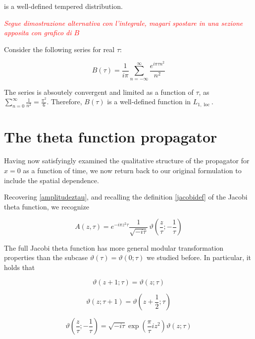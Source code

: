 \documentclass{article}
\newcommand{\T}{\ensuremath{\vartheta}}
\newcommand{\cmnt}[1]{\textcolor{red}{\emph{#1}}}
\newcommand{\sumZ}{\sum_{n=-\infty}^{\infty}}
\newcommand{\locint}{L_{1,\operatorname{loc}}}
\begin{document}
is a well-defined tempered distribution.



\cmnt{Segue dimostrazione alternativa con l'integrale, magari spostare in una sezione apposita con grafico di $B$}

Consider the following series for real $\tau$:

\begin{equation}
    B(\tau) = \frac{1}{i\pi}\sumZ \frac{e^{i\pi\tau n^2} }{n^2}
\end{equation}

The series is absoutely convergent and limited as a function of $\tau$, as $\sum_{n=0}^{\infty} \frac{1}{n^2} = \frac{\pi^2}{6}$. Therefore, $B(\tau)$ is a well-defined function in $\locint$.

\section{The theta function propagator}

Having now satisfyingly examined the qualitative structure of the propagator for $x=0$ as a function of time, we now return back to our original formulation to include the spatial dependence.

Recovering \eqref{amplitudeztau}, and recalling the definition \eqref{jacobidef} of the Jacobi theta function, we recognize

\begin{equation}
    A(z,\tau) = e^{-i\pi z^2 \tau} \frac{1}{\sqrt{-i\tau}}\, \vartheta\left(\frac{z}{\tau};-\frac{1}{\tau}\right)
\end{equation}

The full Jacobi theta function has more general modular transformation properties than the subcase $\vartheta(\tau) = \vartheta(0;\tau)$ we studied before. In particular, it holds that

\begin{equation} \label{zperiodicity}
    \vartheta(z+1;\tau) = \vartheta(z;\tau)
\end{equation}

\begin{equation} \label{tmap}
    \vartheta(z;\tau + 1) = \vartheta(z+\frac{1}{2}; \tau)
\end{equation}

\begin{equation}\label{smapfull}
    \vartheta\left(\frac{z}{\tau}; -\frac{1}{\tau} \right) = \sqrt{-i\tau} \exp(\frac{\pi}{\tau} i z^2) \T(z;\tau)
\end{equation}
\end{document}

